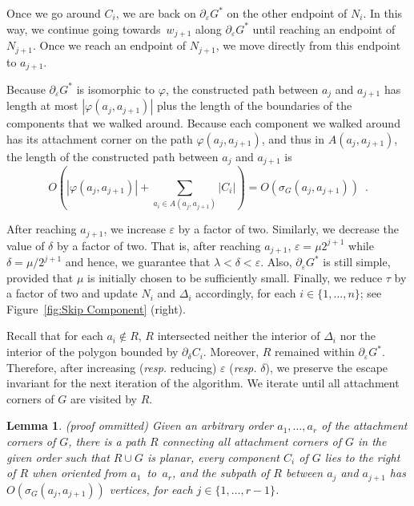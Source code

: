 \documentclass{patmorin}
\newcommand{\appendixproof}{(proof ommitted)\xspace}
\newtheorem{lemma}[theorem]{Lemma}
\begin{document}
Once we go around $C_i$, we are back on $\partial_\varepsilon G^*$ on the other endpoint of $N_i$. In this way, we continue going towards~$w_{j+1}$ along $\partial_\varepsilon G^*$ until reaching an endpoint of $N_{j+1}$.
Once we reach an endpoint of $N_{j+1}$, we move directly from this endpoint to $a_{j+1}$.

Because $\partial_\varepsilon G^*$ is isomorphic to $\varphi$, the constructed path between $a_j$ and $a_{j+1}$ has length at most $|\varphi(a_j, a_{j+1})|$ plus the length of the boundaries of the components that we walked around. Because each component we walked around has its attachment corner on the path $\varphi(a_j, a_{j+1})$, and thus in $A(a_j, a_{j+1})$, the length of the constructed path between $a_j$ and $a_{j+1}$ is
\[ O\left(|\varphi(a_j, a_{j+1})| + \sum_{a_i\in A(a_j, a_{j+1})} |C_i|\right) = O(\sigma_G(a_j, a_{j+1})) \enspace .
\]

After reaching $a_{j+1}$, we increase $\varepsilon$ by a factor of two. Similarly, we decrease the value of $\delta$ by a factor of two. That is, after reaching $a_{j+1}$, $\varepsilon = \mu 2^{j+1}$ while $\delta = \mu/2^{j+1}$ and hence, we guarantee that $\lambda < \delta < \varepsilon$.
Also, $\partial_\varepsilon G^*$ is still simple, provided that $\mu$ is initially chosen to be sufficiently small.
Finally, we reduce $\tau$ by a factor of two and update $N_i$ and $\Delta_i$ accordingly, for each $i\in \{1,\dots,n\}$; see Figure~\ref{fig:Skip Component} (right).

Recall that for each $a_i\notin R$, $R$ intersected neither the interior of $\Delta_i$ nor the interior of the polygon bounded by $\partial_\delta C_i$. Moreover, $R$ remained within $\partial_\varepsilon G^*$.
Therefore, after increasing (\emph{resp.} reducing) $\varepsilon$ (\emph{resp.} $\delta$), we preserve the escape invariant for the next iteration of the algorithm.
We iterate until all attachment corners of $G$ are visited by $R$.

\begin{lemma}\label{lemma:Path for connected augmentations} \appendixproof
Given an arbitrary order $a_1, \ldots, a_r$ of the attachment corners of $G$, there is a path $R$ connecting all attachment corners of $G$ in the given order such that $R\cup G$ is planar, every component $C_i$ of $G$ lies to the right of $R$ when oriented from $a_1$~to~$a_r$, and the subpath of $R$ between $a_j$ and $a_{j+1}$ has $O(\sigma_G(a_j, a_{j+1}))$ vertices, for each $j\in \{1,\dots,r-1\}$.
\end{lemma}
\end{document}
